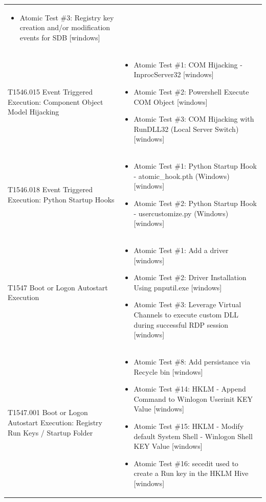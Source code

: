 \begin{longtable}{p{} p{}}
\begin{itemize}[leftmargin=*, nosep, topsep=0pt]
  \item Atomic Test \#3: Registry key creation and/or modification events for SDB [windows]
\end{itemize} \\ [1.5ex]
T1546.015 Event Triggered Execution: Component Object Model Hijacking & \begin{itemize}[leftmargin=*, nosep, topsep=0pt]
  \item Atomic Test \#1: COM Hijacking - InprocServer32 [windows]
  \item Atomic Test \#2: Powershell Execute COM Object [windows]
  \item Atomic Test \#3: COM Hijacking with RunDLL32 (Local Server Switch) [windows]
\end{itemize} \\ [1.5ex]
T1546.018 Event Triggered Execution: Python Startup Hooks & \begin{itemize}[leftmargin=*, nosep, topsep=0pt]
  \item Atomic Test \#1: Python Startup Hook - atomic\_hook.pth (Windows) [windows]
  \item Atomic Test \#2: Python Startup Hook - usercustomize.py (Windows) [windows]
\end{itemize} \\ [1.5ex]
T1547 Boot or Logon Autostart Execution & \begin{itemize}[leftmargin=*, nosep, topsep=0pt]
  \item Atomic Test \#1: Add a driver [windows]
  \item Atomic Test \#2: Driver Installation Using pnputil.exe [windows]
  \item Atomic Test \#3: Leverage Virtual Channels to execute custom DLL during successful RDP session [windows]
\end{itemize} \\ [1.5ex]
T1547.001 Boot or Logon Autostart Execution: Registry Run Keys / Startup Folder & \begin{itemize}[leftmargin=*, nosep, topsep=0pt]
  \item Atomic Test \#8: Add persistance via Recycle bin [windows]
  \item Atomic Test \#14: HKLM - Append Command to Winlogon Userinit KEY Value [windows]
  \item Atomic Test \#15: HKLM - Modify default System Shell - Winlogon Shell KEY Value  [windows]
  \item Atomic Test \#16: secedit used to create a Run key in the HKLM Hive [windows]

\end{itemize}
\end{longtable}
